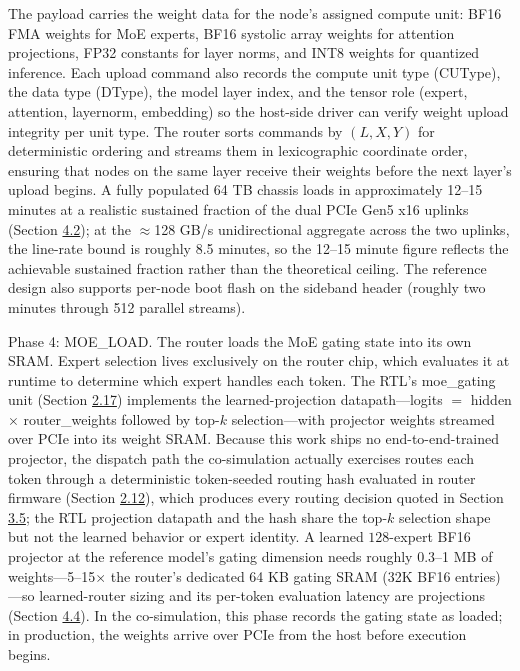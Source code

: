 \documentclass[12pt,onecolumn]{article}
\begin{document}
The payload carries the weight data for the node's assigned compute unit: BF16 FMA weights for MoE experts, BF16 systolic array weights for attention projections, FP32 constants for layer norms, and INT8 weights for quantized inference. Each upload command also records the compute unit type (CUType), the data type (DType), the model layer index, and the tensor role (expert, attention, layernorm, embedding) so the host-side driver can verify weight upload integrity per unit type. The router sorts commands by $(L, X, Y)$ for deterministic ordering and streams them in lexicographic coordinate order, ensuring that nodes on the same layer receive their weights before the next layer's upload begins. A fully populated 64 TB chassis loads in approximately 12--15 minutes at a realistic sustained fraction of the dual PCIe Gen5 x16 uplinks (Section \hyperref[sec:4.2]{4.2}); at the $\approx$128 GB/s unidirectional aggregate across the two uplinks, the line-rate bound is roughly 8.5 minutes, so the 12--15 minute figure reflects the achievable sustained fraction rather than the theoretical ceiling. The reference design also supports per-node boot flash on the sideband header (roughly two minutes through 512 parallel streams).

Phase 4: MOE\_LOAD. The router loads the MoE gating state into its own SRAM. Expert selection lives exclusively on the router chip, which evaluates it at runtime to determine which expert handles each token. The RTL's moe\_gating unit (Section \hyperref[sec:2.17]{2.17}) implements the learned-projection datapath---logits $=$ hidden $\times$ router\_weights followed by top-$k$ selection---with projector weights streamed over PCIe into its weight SRAM. Because this work ships no end-to-end-trained projector, the dispatch path the co-simulation actually exercises routes each token through a deterministic token-seeded routing hash evaluated in router firmware (Section \hyperref[sec:2.12]{2.12}), which produces every routing decision quoted in Section \hyperref[sec:3.5]{3.5}; the RTL projection datapath and the hash share the top-$k$ selection shape but not the learned behavior or expert identity. A learned $128$-expert BF16 projector at the reference model's gating dimension needs roughly $0.3$--1 MB of weights---5--15$\times$ the router's dedicated 64 KB gating SRAM (32K BF16 entries)---so learned-router sizing and its per-token evaluation latency are projections (Section \hyperref[sec:4.4]{4.4}). In the co-simulation, this phase records the gating state as loaded; in production, the weights arrive over PCIe from the host before execution begins.
\end{document}
